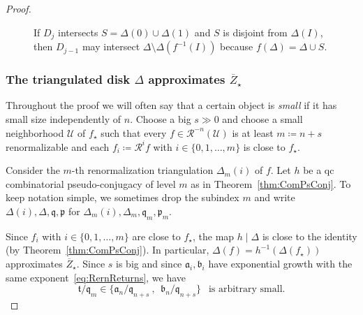\documentclass[]{amsart}
\renewcommand{\sp}{{\ \ }}
\newcommand{\bDelta}{{\mathbb{\Delta}}}
\newcommand\RR{\mathcal{R}}
\newcommand{\str}{{\star}}
\newcommand{\pp}{\mathfrak{p}}
\renewcommand{\aa}{{\mathfrak{a}}}
\newcommand{\bb}{{\mathfrak{b}}}
\renewcommand{\qq}{\mathfrak{q}}
\renewcommand{\tt}{\mathfrak{t}}
\newcommand\UU{\mathcal{U}}
\theoremstyle{remark}
\numberwithin{equation}{section}
\theoremstyle{definition}
\begin{document}
\begin{proof}
\begin{figure}[t!]
{}
\caption{If $D_{j}$ intersects $S=\Delta(0)\cup \Delta(1)$ and $S$ is disjoint from $\Delta(I)$, then $D_{j-1}$ may intersect $\bDelta\setminus \Delta(f^{-1}(I))$ because $f(\bDelta)=\bDelta\cup S$.} \label{Fig:DfnLambda}
\end{figure}


\subsubsection{The triangulated disk $\bDelta$ approximates $\overline Z_\str$}
\label{sss:KeyLmmConvent}
Throughout the proof we will often say that a certain object is \emph{small} if it has  small size independently of $n$. Choose a big $s\gg 0$ and choose a small neighborhood $\UU$ of $f_\str$ such that every $f\in \RR^{-n}(\UU)$ is at least $m\coloneqq n+s$ renormalizable and each $f_i\coloneqq \RR^i f$ with $i\in  \{0,1,\dots ,m\}$ is close to $f_\str.$ 


Consider the $m$-th renormalization triangulation $\Delta_{m}(i)$ of $f$. Let $h$ be a qc combinatorial pseudo-conjugacy of level $m$ as in Theorem~\ref{thm:ComPsConj}. To keep notation simple, we sometimes drop the subindex $m$ and write $\Delta(i), \bDelta, \qq, \pp$ for $\Delta_{m}(i),\bDelta_{m}, \qq_{m}, \pp_{m}$.




Since $f_i$ with $i\in  \{0,1,\dots ,m\}$ are close to $f_\str$, the map $h\mid \bDelta$ is close to the identity (by Theorem~\ref{thm:ComPsConj}). In particular, $\bDelta(f)=h^{-1}(\bDelta(f_\str))$ approximates $\overline Z_\str$. Since $s$ is big and since $\aa_i,\bb_i$ have exponential growth with the same exponent~\eqref{eq:RernReturns}, we have
 \begin{equation}
 \label{eq:t over q is small}
 \tt/\qq_m\in \{\aa_n/\qq_{n+s}~,\sp \bb_{n}/\qq_{n+s}\} \sp \text{ is arbitrary small.}
\end{equation}




\end{proof}
\end{document}
